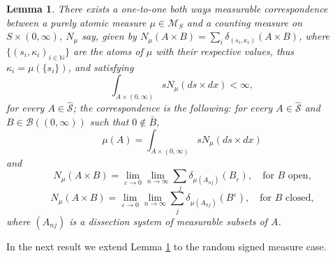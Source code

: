 \documentclass{article}
\theoremstyle{plain}
\newtheorem{lemma}[theorem]{Lemma}
\theoremstyle{remark}
\begin{document}
\begin{lemma}\label{lem-correspondence-pos}
	There exists a one-to-one both ways measurable correspondence between a purely atomic measure $\mu\in\mathcal{M}_S$ and a counting measure on $S\times(0,\infty)$, $N_\mu$ say, given by $N_\mu(A\times B)=\sum_{i}\delta_{(s_i,\kappa_i)}(A\times B)$, where $\{(s_i,\kappa_i)_{i\in\mathbb{N}}\}$ are the atoms of $\mu$ with their respective values, thus $\kappa_i=\mu(\{s_i\})$, and satisfying
	\begin{equation}\label{D0}
		\int_{A\times(0,\infty)} sN_{\mu}(ds\times dx)<\infty,
	\end{equation}
	for every $A\in\hat{\mathcal{S}}$; the correspondence is the following: for every $A\in\hat{\mathcal{S}}$ and $B\in \mathcal{B} ((0,\infty))$ such that $0\notin\bar{B}$,
	\begin{equation}\label{D1}
		\mu(A)=	\int_{A\times(0,\infty)} sN_{\mu}(ds\times dx)
	\end{equation}
	and
	\begin{equation}\label{D2}
		N_{\mu}(A\times B)=\lim\limits_{\varepsilon\to 0}\lim\limits_{n\to\infty}\sum_{j}\delta_{\mu(A_{nj})}(B_{\varepsilon}),\quad\text{for $B$ open,}
	\end{equation}
	\begin{equation}\label{D3}
		N_{\mu}(A\times B)=\lim\limits_{\varepsilon\to 0}\lim\limits_{n\to\infty}\sum_{j}\delta_{\mu(A_{nj})}(B^{\varepsilon}),\quad\text{for $B$ closed,}
	\end{equation}
	where $(A_{nj})$ is a dissection system of measurable subsets of $A$.
\end{lemma}


In the next result we extend Lemma \ref{lem-correspondence-pos} to the random signed measure case.
\end{document}
